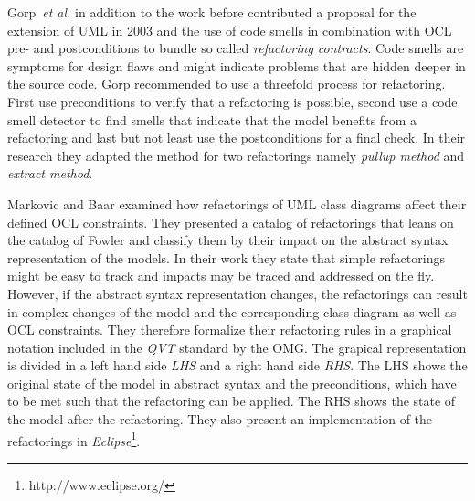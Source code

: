 \documentclass{llncs}
\begin{document}
Gorp~\textit{et al.} \cite{gorp03} in addition to the work before contributed a proposal for the extension of UML in
2003 and the use of code smells in combination with OCL pre- and postconditions to bundle so called
\textit{refactoring contracts}. Code smells are symptoms for design flaws and might indicate problems that are hidden
deeper in the source code. Gorp recommended to use a threefold process for refactoring. First use preconditions to
verify that a refactoring is possible, second use a code smell detector to find smells that indicate that the model 
benefits from a refactoring and last but not least use the postconditions for a final check. In their research they
adapted the method for two refactorings namely \textit{pullup method} and \textit{extract method}.

Markovic and Baar \cite{DBLP:journals/sosym/MarkovicB08} examined how refactorings of UML class diagrams affect their
defined OCL constraints. They presented a catalog of refactorings that leans on the catalog of Fowler and classify
them by their impact on the abstract syntax representation of the models. In their work they state that simple refactorings
might be easy to track and impacts may be traced and addressed on the fly. However, if the abstract syntax representation
changes, the refactorings can result in complex changes of the model and the corresponding class diagram as well as OCL
constraints. They therefore formalize their refactoring rules in a graphical notation included in the
\textit{QVT} \cite{man:QVT} standard by the OMG. The grapical representation is divided
in a left hand side \textit{LHS} and a right hand side \textit{RHS}. The LHS shows the original state of the model
in abstract syntax and the preconditions, which have to be met such that the refactoring can be applied. The RHS shows
the state of the model after the refactoring. They also present an implementation of the refactorings in
\textit{Eclipse}\footnote{http://www.eclipse.org/}.
\end{document}
